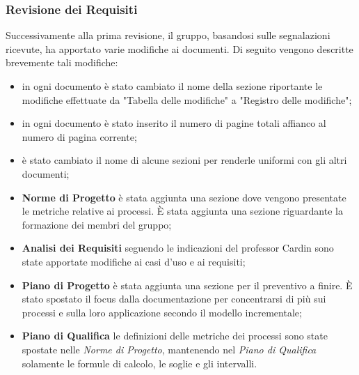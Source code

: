 \subsubsection{Revisione dei Requisiti}
Successivamente alla prima revisione, il gruppo, basandosi sulle 
segnalazioni ricevute, ha apportato varie modifiche ai documenti. 
Di seguito vengono descritte brevemente tali modifiche:
\begin{itemize}
	\item in ogni documento è stato cambiato il nome della sezione 
	riportante le modifiche effettuate da "Tabella delle modifiche" a 
	"Registro delle modifiche";
	\item in ogni documento è stato inserito il numero di pagine totali 
	affianco al numero di pagina corrente;
	\item è stato cambiato il nome di alcune sezioni per renderle uniformi 
	con gli altri documenti;
	\item \textbf{Norme di Progetto} è stata aggiunta una sezione dove 
	vengono presentate le metriche relative ai processi. È stata aggiunta
	una sezione riguardante la formazione dei membri del gruppo;
	\item \textbf{Analisi dei Requisiti} seguendo le indicazioni del 
	professor Cardin sono state apportate modifiche ai casi d'uso e ai requisiti;
	\item \textbf{Piano di Progetto} è stata aggiunta una sezione per il 
	preventivo a finire. È stato spostato il focus dalla documentazione per concentrarsi di più sui processi e sulla loro applicazione secondo il modello incrementale;
	\item \textbf{Piano di Qualifica} le definizioni 
	delle metriche dei processi sono state spostate nelle \textit{Norme di Progetto}, mantenendo nel \textit{Piano di Qualifica} solamente le formule di calcolo, le soglie e gli intervalli.
\end{itemize}


